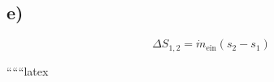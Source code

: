 

\subsection*{e)}
\begin{equation*}
\Delta S_{1,2} = \dot{m}_{\text{ein}} \left( s_2 - s_1 \right)
\end{equation*}

``````latex